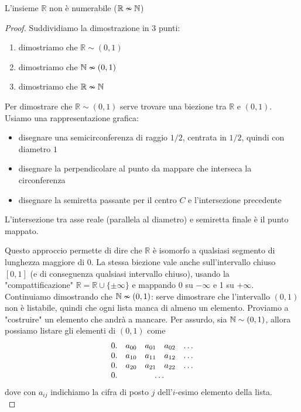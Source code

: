 \begin{theor}
	L'insieme $\mathbb{R}$ non è numerabile ($\mathbb{R} \nsim \mathbb{N}$)
\end{theor}
\begin{proof}
	Suddividiamo la dimostrazione in 3 punti: 
	\begin{enumerate}
		\item dimostriamo che $\mathbb{R} \sim (0,1)$
		\item dimostriamo che $\mathbb{N} \nsim (0,1)$
		\item dimostriamo che $\mathbb{R} \nsim \mathbb{N}$
	\end{enumerate}
	
	Per dimostrare che $\mathbb{R} \sim (0,1)$ serve trovare una biezione tra $\mathbb{R}$ e $(0,1)$. Usiamo una rappresentazione grafica: 
	\begin{itemize}
		\item disegnare una semicirconferenza di raggio $1/2$, centrata in $1/2$, quindi con diametro $1$
		\item disegnare la perpendicolare al punto da mappare che interseca la circonferenza
		\item disegnare la semiretta passante per il centro $C$ e l'intersezione precedente
	\end{itemize}
	L'intersezione tra asse reale (parallela al diametro) e semiretta finale è il punto mappato. 
	
	\begin{center}
		
	\end{center}
	
	Questo approccio permette di dire che $\mathbb{R}$ è isomorfo a qualsiasi segmento di lunghezza maggiore di $0$. La stessa biezione vale anche sull'intervallo chiuso $[0,1]$ (e di conseguenza qualsiasi intervallo chiuso), usando la "compattificazione" $\mathbb{R} = \mathbb{R} \cup \{\pm \infty\}$ e mappando $0$ su $-\infty$ e 1 su $+ \infty$.\\
	
	Continuiamo dimostrando che $\mathbb{N} \nsim (0,1)$: serve dimostrare che l'intervallo $(0,1)$ non è listabile, quindi che ogni lista manca di almeno un elemento. Proviamo a "costruire" un elemento che andrà a mancare. Per assurdo, sia $\mathbb{N} \sim (0,1)$, allora possiamo listare gli elementi di $(0,1)$ come 
	$$ 
	\begin{array}{c c c c c}
		0. & a_{00} & a_{01} & a_{02} & \dots \\
		0. & a_{10} & a_{11} & a_{12} & \dots \\
		0. & a_{20} & a_{21} & a_{22} & \dots \\
		0. & \multicolumn{4}{c}{\dots}
	\end{array}
	$$
	dove con $a_{ij}$ indichiamo la cifra di posto $j$ dell'$i$-esimo elemento della lista.\\
	

\end{proof}

